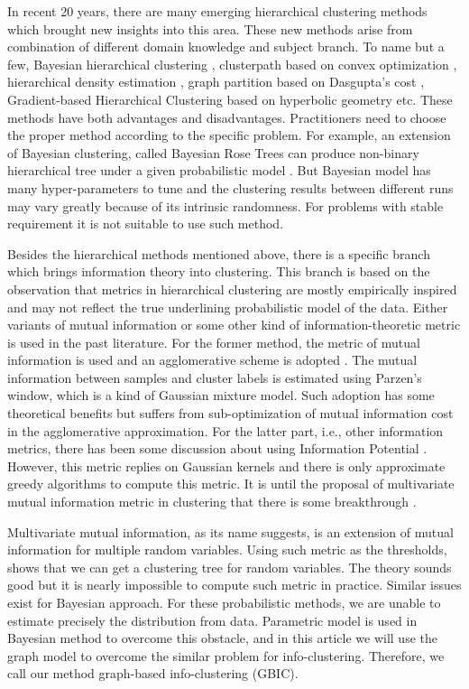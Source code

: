 In recent 20 years, there are many emerging hierarchical clustering methods which brought new insights into this area. These new methods arise from combination of different domain knowledge and
subject branch. To name but a few, 
Bayesian hierarchical clustering \citep{bhc},
clusterpath based on convex optimization \citep{hocking2011clusterpath},
hierarchical density estimation \citep{hde}, 
graph partition based on Dasgupta's cost \citep{dasgupta2016cost},
Gradient-based Hierarchical Clustering based on hyperbolic geometry \citep{hyperbolic} etc.
These methods have both advantages and disadvantages.
Practitioners need to choose the proper method according to the specific problem.
For example, an extension of Bayesian clustering, called Bayesian Rose Trees 
can produce non-binary hierarchical tree
under a given probabilistic model \citep{blundell2011discovering}.
But Bayesian model has many hyper-parameters to tune and the clustering results between different runs may vary greatly because of its intrinsic randomness. For problems with stable requirement it
is not suitable to use such method.


Besides the hierarchical methods mentioned above, there is a specific branch which brings information theory into clustering. This branch is based on the observation that metrics in hierarchical clustering
are mostly empirically inspired and may not reflect the true underlining probabilistic model of the data.
Either variants of mutual information or some other kind of information-theoretic metric is used in the past literature. For the former method, the metric of mutual information is used and an agglomerative scheme is adopted \citep{mim}. The mutual information between samples and cluster labels is estimated using Parzen's window, which is a kind of Gaussian mixture model. Such adoption
has some theoretical benefits but suffers from sub-optimization of mutual information cost in the agglomerative approximation.
For the latter part, i.e., other information metrics, there has been some discussion about using Information Potential \citep{ic2002}. However, this metric replies on Gaussian kernels and there is only approximate greedy algorithms to compute this metric. It is until the proposal of multivariate mutual information metric in clustering that there is some breakthrough \citep{ic2016}.

Multivariate mutual information, as its name suggests, is an extension of mutual information for multiple
random variables. Using such metric as the thresholds, \citet{ic2016} shows that we can get a clustering
tree for random variables. The theory sounds good but it is nearly impossible to compute such metric
in practice. Similar issues exist for Bayesian approach. For these probabilistic methods, we
are unable to estimate precisely the distribution from data. Parametric model is used in Bayesian
method to overcome this obstacle, and in this article we will use the graph model to overcome the similar problem for info-clustering.
Therefore, we call our method graph-based info-clustering (GBIC).

